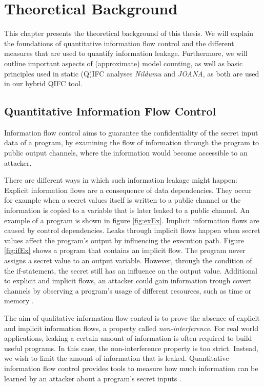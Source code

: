 \chapter{Theoretical Background}\label{sec:basics}

This chapter presents the theoretical background of this thesis. We will explain the foundations of quantitative information flow control and the different measures that are used to quantify information leakage. Furthermore, we will outline important aspects of (approximate) model counting, as well as basic principles used in static (Q)IFC analyses \emph{Nildumu} and \emph{JOANA}, as both are used in our hybrid QIFC tool.

\section{Quantitative Information Flow Control}

Information flow control aims to guarantee the confidentiality of the secret input data of a program, by examining the flow of information through the program to public output channels, where the information would become accessible to an attacker.

There are different ways in which such information leakage might happen: Explicit information flows are a consequence of data dependencies. They occur for example when a secret values itself is written to a public channel or the information is copied to a variable that is later leaked to a public channel. An example of a program is shown in figure \ref{fig:exEx}. Implicit information flows are caused by control dependencies. Leaks through implicit flows happen when secret values affect the program's output by influencing the execution path. Figure \ref{fig:ifEx} shows a program that contains an implicit flow. The program never assigns a secret value to an output variable. However, through the condition of the if-statement, the secret still has an influence on the output value. 
Additional to explicit and implicit flows, an attacker could gain information trough covert channels by observing a program's usage of different resources, such as time or memory \cite{smith07}.

The aim of qualitative information flow control is to prove the absence of explicit and implicit information flows, a property called \emph{non-interference}. For real world applications, leaking a certain amount of information is often required to build useful programs. In this case, the non-interference property is too strict. Instead, we wish to limit the amount of information that is leaked. Quantitative information flow control provides tools to measure how much information can be learned by an attacker about a program's secret inputs \cite{smith09}.

